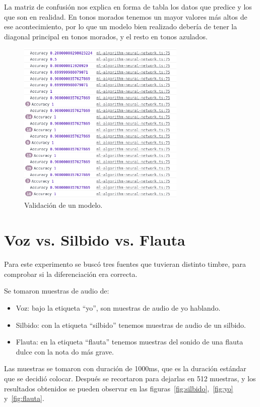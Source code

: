 \documentclass[a4paper, 12pt]{book}
\begin{document}
La matriz de confusión nos explica en forma de tabla los datos que predice y los que son en realidad. En tonos morados tenemos un mayor valores más altos de ese acontecimiento, por lo que un modelo bien realizado debería de tener la diagonal principal en tonos morados, y el resto en tonos azulados.


\begin{figure}
	\centering
	\includegraphics[width=8cm, keepaspectratio]{img/accuracy2.png}
	\caption{Validación de un modelo.}\label{fig:validacion}
\end{figure}

\section{Voz vs. Silbido vs. Flauta}
\label{sec:yo-silv-flauta}

Para este experimento se buscó tres fuentes que tuvieran distinto timbre, para comprobar si la diferenciación era correcta.

Se tomaron muestras de audio de:
\begin{itemize}
	\item Voz: bajo la etiqueta ``yo'', son muestras de audio de yo hablando.
	\item Silbido: con la etiqueta ``silbido'' tenemos muestras de audio de un silbido.
	\item Flauta: en la etiqueta ``flauta'' tenemos muestras del sonido de una flauta dulce con la nota do más grave.
\end{itemize}

Las muestras se tomaron con duración de 1000ms, que es la duración estándar que se decidió colocar. Después se recortaron para dejarlas en 512 muestras, y los resultados obtenidos se pueden observar en las figuras~\ref{fig:silbido},~\ref{fig:yo} y~\ref{fig:flauta}.
\end{document}
